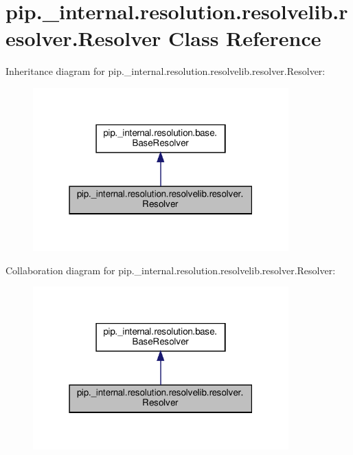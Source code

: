 \hypertarget{classpip_1_1__internal_1_1resolution_1_1resolvelib_1_1resolver_1_1Resolver}{}\section{pip.\+\_\+internal.\+resolution.\+resolvelib.\+resolver.\+Resolver Class Reference}
\label{classpip_1_1__internal_1_1resolution_1_1resolvelib_1_1resolver_1_1Resolver}


Inheritance diagram for pip.\+\_\+internal.\+resolution.\+resolvelib.\+resolver.\+Resolver\+:
\nopagebreak
\begin{figure}[H]
\begin{center}
\leavevmode
\includegraphics[width=279pt]{classpip_1_1__internal_1_1resolution_1_1resolvelib_1_1resolver_1_1Resolver__inherit__graph}
\end{center}
\end{figure}


Collaboration diagram for pip.\+\_\+internal.\+resolution.\+resolvelib.\+resolver.\+Resolver\+:
\nopagebreak
\begin{figure}[H]
\begin{center}
\leavevmode
\includegraphics[width=279pt]{classpip_1_1__internal_1_1resolution_1_1resolvelib_1_1resolver_1_1Resolver__coll__graph}
\end{center}
\end{figure}
